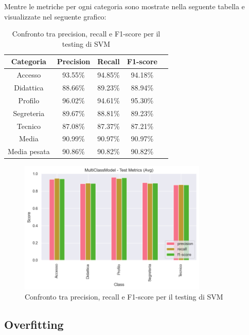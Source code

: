 Mentre le metriche per ogni categoria sono mostrate nella seguente tabella e visualizzate nel seguente grafico:

\begin{table}[H]
    \centering
    \begin{tabular}{|c|c|c|c|c|}
        \hline
        \textbf{Categoria} & \textbf{Precision} & \textbf{Recall} & \textbf{F1-score} \\
        \hline
        Accesso & 93.55\% & 94.85\% & 94.18\% \\
        \hline
        Didattica & 88.66\% & 89.23\% & 88.94\% \\
        \hline
        Profilo & 96.02\% & 94.61\% & 95.30\% \\
        \hline
        Segreteria & 89.67\% & 88.81\% & 89.23\% \\
        \hline
        Tecnico & 87.08\% & 87.37\% & 87.21\% \\
        \hline
        Media & 90.99\% & 90.97\% & 90.97\% \\
        \hline
        Media pesata & 90.86\% & 90.82\% & 90.82\% \\
        \hline
    \end{tabular}
    \caption{Confronto tra precision, recall e F1-score per il testing di SVM}
    \label{tab:metriche_svm_test}
\end{table}

\begin{figure}[H]
    \centering
    \includegraphics[width=0.8\textwidth]{images/metrics_test_svm.png}
    \caption{Confronto tra precision, recall e F1-score per il testing di SVM}
    \label{fig:metrics_test_svm}
\end{figure}

\subsection{Overfitting}


